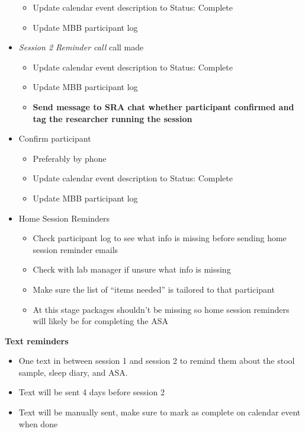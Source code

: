 \documentclass[
]{book}
\providecommand{\tightlist}{%
  \setlength{\itemsep}{0pt}\setlength{\parskip}{0pt}}
\begin{document}
\begin{itemize}
  \begin{itemize}
  \tightlist
  \item
    Update calendar event description to Status: Complete
  \item
    Update MBB participant log
  \end{itemize}
\item
  \emph{Session 2 Reminder call} call made

  \begin{itemize}
  \tightlist
  \item
    Update calendar event description to Status: Complete
  \item
    Update MBB participant log
  \item
    \textbf{Send message to SRA chat whether participant confirmed and tag the researcher running the session}
  \end{itemize}
\item
  Confirm participant

  \begin{itemize}
  \tightlist
  \item
    Preferably by phone
  \item
    Update calendar event description to Status: Complete
  \item
    Update MBB participant log
  \end{itemize}
\item
  Home Session Reminders

  \begin{itemize}
  \tightlist
  \item
    Check participant log to see what info is missing before sending home session reminder emails\\
  \item
    Check with lab manager if unsure what info is missing\\
  \item
    Make sure the list of ``items needed'' is tailored to that participant
  \item
    At this stage packages shouldn't be missing so home session reminders will likely be for completing the ASA
  \end{itemize}
\end{itemize}

\textbf{Text reminders}

\begin{itemize}
\tightlist
\item
  One text in between session 1 and session 2 to remind them about the stool sample, sleep diary, and ASA.\\
\item
  Text will be sent 4 days before session 2
\item
  Text will be manually sent, make sure to mark as complete on calendar event when done
\end{itemize}
\end{document}
